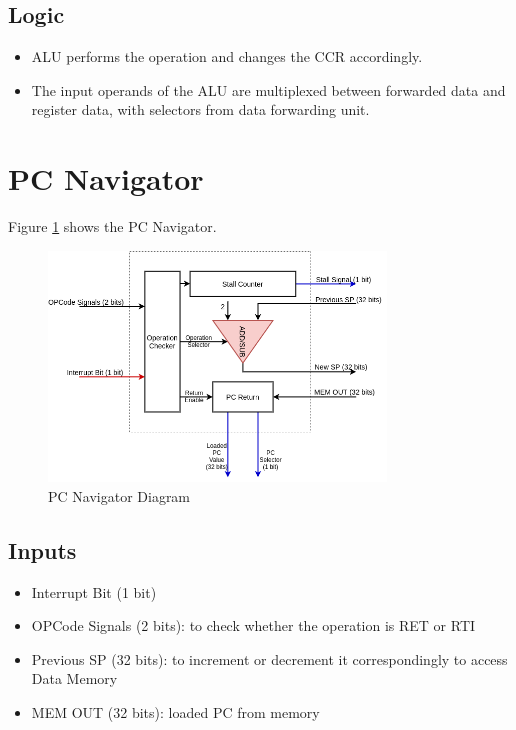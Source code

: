 \subsection{Logic}
\begin{itemize}
    \item ALU performs the operation and changes the CCR accordingly.
    \item The input operands of the ALU are multiplexed between forwarded data and register data, with selectors from data forwarding unit.
\end{itemize}


\section{PC Navigator}
Figure \ref{fig:pc_nav} shows the PC Navigator.

\begin{figure}[hp]
    \centering
    \includegraphics[width=0.8\textwidth]{images/pc_nav.png}
    \caption{PC Navigator Diagram}
    \label{fig:pc_nav}
\end{figure}

\subsection{Inputs}
\begin{itemize}
    \item Interrupt Bit (1 bit)
    \item OPCode Signals (2 bits): to check whether the operation is RET or RTI
    \item Previous SP (32 bits): to increment or decrement it correspondingly to access Data Memory
    \item MEM OUT (32 bits): loaded PC from memory
\end{itemize}


